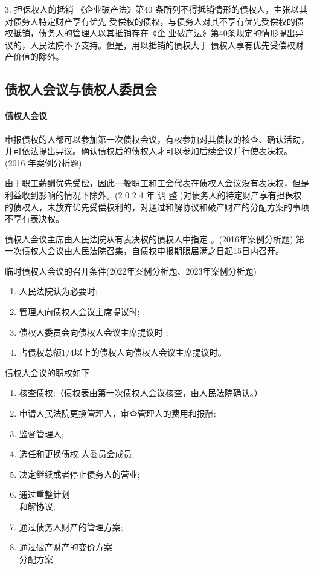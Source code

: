 \documentclass[UTF8,12pt]{ctexart}
\numberwithin{equation}{section} %
\numberwithin{figure}{section}
\numberwithin{table}{section}
\begin{document}
	3. 担保权人的抵销
	《企业破产法》第40 条所列不得抵销情形的债权人，主张以其对债务人特定财产享有优先 受偿权的债权，与债务人对其不享有优先受偿权的债权抵销，债务人的管理人以其抵销存在《企 业破产法》第40条规定的情形提出异议的，人民法院不予支持。但是，用以抵销的债权大于 债权人享有优先受偿权财产价值的除外。
	
	
	\subsection{债权人会议与债权人委员会}
	\paragraph{债权人会议}
	申报债权的人都可以参加第一次债权会议，有权参加对其债权的核查、确认活动，并可依法提出异议。确认债权后的债权人才可以参加后续会议并行使表决权。(2016 年案例分析题)

	由于职工薪酬优先受偿，因此一般职工和工会代表在债权人会议没有表决权，但是利益收到影响的情况下除外。(2 0 2 4 年 调 整 )对债务人的特定财产享有担保权的债权人，未放弃优先受偿权利的，对通过和解协议和破产财产的分配方案的事项不享有表决权。
	
	债权人会议主席由人民法院从有表决权的债权人中指定 。(2016年案例分析题) 第一次债权人会议由人民法院召集，自债权申报期限届满之日起15日内召开。 
	
	临时债权人会议的召开条件(2022年案例分析题、2023年案例分析题)
	\begin{enumerate}
		\item 人民法院认为必要时;
		
		\item 管理人向债权人会议主席提议时;
		
		\item 债权人委员会向债权人会议主席提议时 ;
		
		\item  占债权总额1/4以上的债权人向债权人会议主席提议时。
	\end{enumerate}
	
	
	债权人会议的职权如下
	\begin{enumerate}
		\item 核查债权;（债权表由第一次债权人会议核查，由人民法院确认。）
		
		\item 申请人民法院更换管理人，审查管理人的费用和报酬;
		
		\item 监督管理人;
		
		\item 选任和更换债权 人委员会成员;
		
		\item 决定继续或者停止债务人的营业;
		
		\item 通过重整计划\\和解协议;
		
		\item 通过债务人财产的管理方案;
		
		\item 通过破产财产的变价方案\\分配方案
	\end{enumerate}
	
\end{document}
